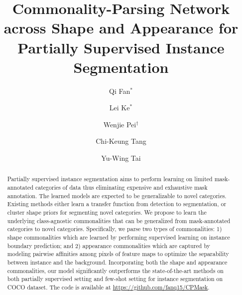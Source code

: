 \documentclass[runningheads]{llncs}
\newcommand{\mymodel}{Commonality-Parsing Network\xspace}
\begin{document}
\pagestyle{headings}
\mainmatter
\def\ECCVSubNumber{596}  

\title{\mymodel across Shape and Appearance for Partially Supervised  Instance Segmentation} 



\begin{comment}
\titlerunning{ECCV-20 submission ID \ECCVSubNumber} 
\authorrunning{ECCV-20 submission ID \ECCVSubNumber} 
\author{Anonymous ECCV submission}
\institute{Paper ID \ECCVSubNumber}
\end{comment}


\titlerunning{\mymodel}


\def\thefootnote{$*$}
\def\thefootnote{$\dagger$}

\author{Qi Fan$^*$ \and
Lei Ke$^*$ \and
Wenjie Pei$^\dagger$ \and
Chi-Keung Tang \and
Yu-Wing Tai}
\maketitle

\begin{abstract}

Partially supervised instance segmentation aims to perform learning on limited mask-annotated categories of data thus eliminating expensive and exhaustive mask annotation. The learned models are expected to be generalizable to novel categories. Existing methods either learn a transfer function from detection to segmentation, or cluster shape priors for segmenting novel categories. We propose to learn the underlying class-agnostic commonalities that can be generalized from mask-annotated categories to novel categories. Specifically, we parse two types of commonalities: 1) shape commonalities which are learned by performing supervised learning on instance boundary prediction; and 2) appearance commonalities which are captured by modeling pairwise affinities among pixels of feature maps to optimize the separability between instance and the background. Incorporating both the shape and appearance commonalities, our model significantly outperforms the state-of-the-art methods on both partially supervised setting and few-shot setting for instance segmentation on COCO dataset. The code is available at {\color{magenta}\url{https://github.com/fanq15/CPMask}}.


\vspace{-3mm}
\end{abstract}
\end{document}
